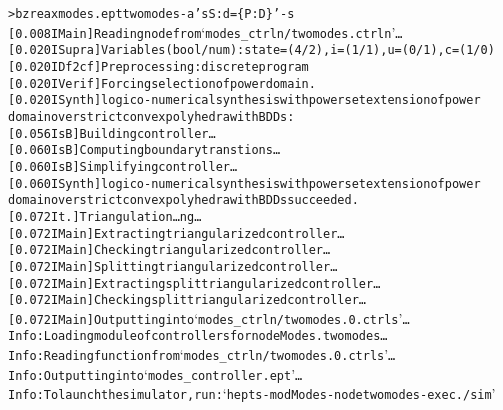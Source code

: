 \documentclass[a4paper]{article}
\begin{document}
\begin{alltt}
\textcolor{deepgreen}{> bzreax modes.ept twomodes -a 'sS:d=\{P:D\}' -s}
[0.008 I Main] Reading node from `modes_ctrln/twomodes.ctrln'…
[0.020 I Supra] Variables(bool/num): state=(4/2), i=(1/1), u=(0/1), c=(1/0)
[0.020 I Df2cf] Preprocessing: discrete program
[0.020 I Verif] Forcing selection of power domain.
[0.020 I Synth] logico-numerical synthesis with powerset extension of power
                domain over strict convex polyhedra with BDDs:
[0.056 I sB] Building controller…
[0.060 I sB] Computing boundary transtions…
[0.060 I sB] Simplifying controller…
[0.060 I Synth] logico-numerical synthesis with powerset extension of power
                domain over strict convex polyhedra with BDDs succeeded.
[0.072 I t.] Triangulation…ng…
[0.072 I Main] Extracting triangularized controller…
[0.072 I Main] Checking triangularized controller…
[0.072 I Main] Splitting triangularized controller…
[0.072 I Main] Extracting split triangularized controller…
[0.072 I Main] Checking split triangularized controller…
[0.072 I Main] Outputting into `modes_ctrln/twomodes.0.ctrls'…
Info: Loading module of controllers for node Modes.twomodes…
Info: Reading function from `modes_ctrln/twomodes.0.ctrls'…
Info: Outputting into `modes_controller.ept'…
Info: To launch the simulator, run: `hepts -mod Modes -node twomodes -exec ./sim'
\end{alltt}



\end{document}
